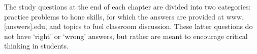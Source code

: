 \documentclass{tufte-book} %
\begin{document}
The study questions at the end of each chapter are divided into two categories: practice problems to hone skills, for which the answers are provided at www.[answers].edu, and topics to fuel classroom discussion. These latter questions do not have `right' or `wrong' answers, but rather are meant to encourage critical thinking in students.






\end{document}
